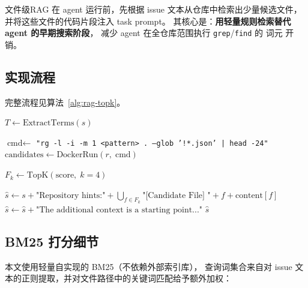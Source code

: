 文件级RAG 在 agent 运行前，先根据 issue 文本从仓库中检索出少量候选文件，
并将这些文件的代码片段注入 task prompt。
其核心是：\textbf{用轻量规则检索替代 agent 的早期搜索阶段}，
减少 agent 在全仓库范围执行 \texttt{grep}/\texttt{find} 的 词元 开销。

\subsection{实现流程}

完整流程见算法~\ref{alg:rag-topk}。

\begin{algorithm}[H]
\caption{文件级RAG：rag\_topk}
\label{alg:rag-topk}

\BlankLine
{}
$T \leftarrow \text{ExtractTerms}(s)$ 

\BlankLine
{}
$\text{cmd} \leftarrow$ \texttt{"rg -l -i -m 1 <pattern> . --glob '!*.json' | head -24"}\;
$\text{candidates} \leftarrow \text{DockerRun}(r,\; \text{cmd})$ 

\BlankLine
{}

\BlankLine
{}
$F_k \leftarrow \text{TopK}(\text{score},\; k=4)$\;

\BlankLine
{}
$\hat{s} \leftarrow s + \text{"Repository hints:"} + \bigcup_{f \in F_k} \text{"[Candidate File] "} + f + \text{content}[f]$\;
$\hat{s} \leftarrow \hat{s} + \text{"The additional context is a starting point..."}$\;
\Return $\hat{s}$\;
\end{algorithm}

\subsection{BM25 打分细节}

本文使用轻量自实现的 BM25（不依赖外部索引库），
查询词集合来自对 issue 文本的正则提取，并对文件路径中的关键词匹配给予额外加权：

